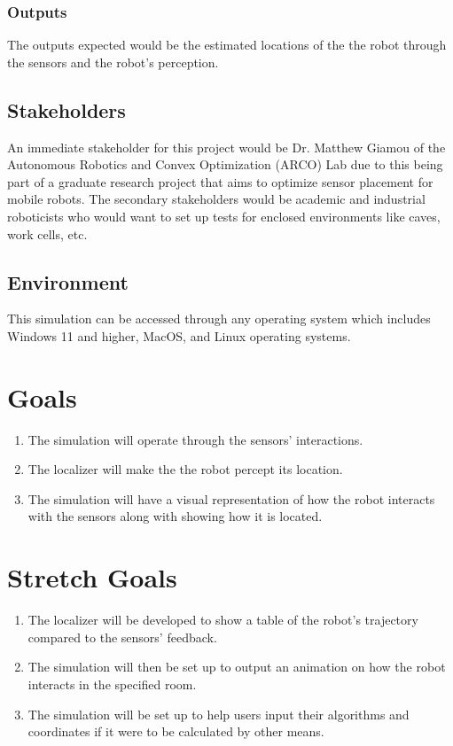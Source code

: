 \documentclass{article}
\begin{document}
\subsubsection{Outputs}
The outputs expected would be the estimated locations of the the robot through the sensors and the robot's perception.

\subsection{Stakeholders}
An immediate stakeholder for this project would be Dr. Matthew Giamou of the Autonomous Robotics and Convex Optimization (ARCO) Lab due to this being part of a graduate research project that aims to optimize sensor placement for mobile robots. The secondary stakeholders would be academic and industrial roboticists who would want to set up tests for enclosed environments like caves, work cells, etc.

\subsection{Environment}
This simulation can be accessed through any operating system which includes Windows 11 and higher, MacOS, and Linux operating systems.

\section{Goals}
\begin{enumerate}
    \item The simulation will operate through the sensors' interactions.
    \item The localizer will make the the robot percept its location.
    \item The simulation will have a visual representation of how the robot interacts with the sensors along with showing how it is located.
\end{enumerate} 

\section{Stretch Goals}
\begin{enumerate}           
    \item The localizer will be developed to show a table of the robot's trajectory compared to the sensors' feedback.
    \item The simulation will then be set up to output an animation on how the robot interacts in the specified room.
    \item The simulation will be set up to help users input their algorithms and coordinates if it were to be calculated by other means.
\end{enumerate}
\end{document}
